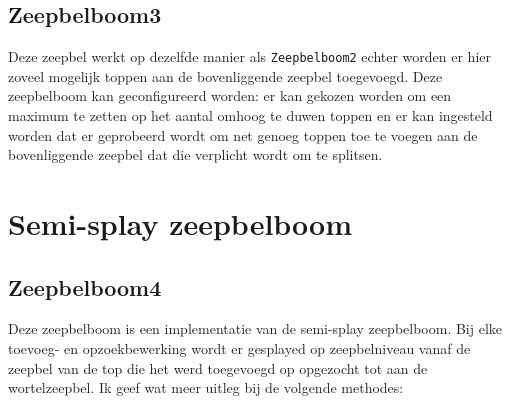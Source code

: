 \documentclass[12pt,hidelinks]{article}
\begin{document}
    \subsection{Zeepbelboom3}
    Deze zeepbel werkt op dezelfde manier als {\tt Zeepbelboom2} echter worden er hier
    zoveel mogelijk toppen aan de bovenliggende zeepbel toegevoegd. Deze zeepbelboom
    kan geconfigureerd worden: er kan gekozen worden om een maximum te zetten op het 
    aantal omhoog te duwen toppen en er kan ingesteld worden dat er geprobeerd wordt
    om net genoeg toppen toe te voegen aan de bovenliggende zeepbel dat die verplicht
    wordt om te splitsen.  
    \section{Semi-splay zeepbelboom}
    \subsection{Zeepbelboom4}
    Deze zeepbelboom is een implementatie van de semi-splay zeepbelboom. 
    Bij elke toevoeg- en opzoekbewerking wordt er gesplayed op zeepbelniveau vanaf de zeepbel van de top die het werd toegevoegd op opgezocht tot aan de wortelzeepbel.
    Ik geef wat meer uitleg bij de volgende methodes:
\end{document}
